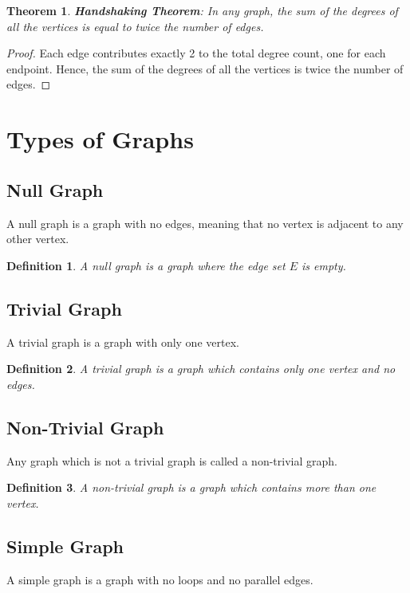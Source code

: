 \documentclass{article}
\newtheorem{definition}{Definition}
\newtheorem{theorem}{Theorem}
\begin{document}
\begin{theorem}
	\textbf{Handshaking Theorem}: In any graph, the sum of the degrees of all the vertices is equal to twice the number of edges.
\end{theorem}

\begin{proof}
	Each edge contributes exactly 2 to the total degree count, one for each endpoint. Hence, the sum of the degrees of all the vertices is twice the number of edges.
\end{proof}

\section{Types of Graphs}

\subsection{Null Graph}
A null graph is a graph with no edges, meaning that no vertex is adjacent to any other vertex.

\begin{definition}
	A \textit{null graph} is a graph where the edge set \(E\) is empty.
\end{definition}

\subsection{Trivial Graph}
A trivial graph is a graph with only one vertex.

\begin{definition}
	A \textit{trivial graph} is a graph which contains only one vertex and no edges.
\end{definition}

\subsection{Non-Trivial Graph}
Any graph which is not a trivial graph is called a non-trivial graph.

\begin{definition}
	A \textit{non-trivial graph} is a graph which contains more than one vertex.
\end{definition}

\subsection{Simple Graph}
A simple graph is a graph with no loops and no parallel edges.
\end{document}
